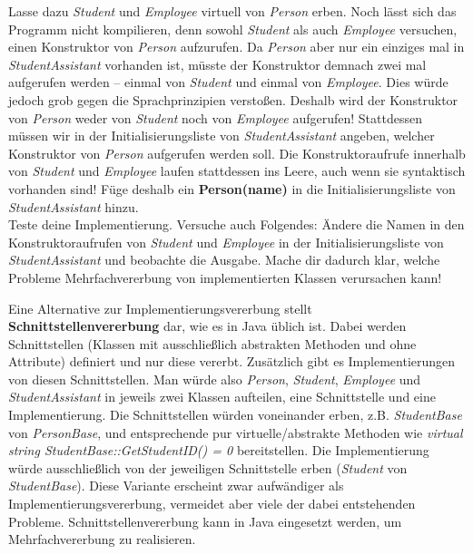 \begin{enumerate}
Lasse dazu \emph{Student} und \emph{Employee} virtuell von \emph{Person} erben.
Noch lässt sich das Programm nicht kompilieren, denn sowohl \emph{Student} als auch \emph{Employee} versuchen, einen Konstruktor von \emph{Person} aufzurufen.
Da \emph{Person} aber nur ein einziges mal in \emph{StudentAssistant} vorhanden ist, müsste der Konstruktor demnach zwei mal aufgerufen werden -- einmal von \emph{Student} und einmal von \emph{Employee}.
Dies würde jedoch grob gegen die Sprachprinzipien verstoßen.
Deshalb wird der Konstruktor von \emph{Person} weder von \emph{Student} noch von \emph{Employee} aufgerufen!
Stattdessen müssen wir in der Initialisierungsliste von \emph{StudentAssistant} angeben, welcher Konstruktor von \emph{Person} aufgerufen werden soll.
Die Konstruktoraufrufe innerhalb von \emph{Student} und \emph{Employee} laufen stattdessen ins Leere, auch wenn sie syntaktisch vorhanden sind! Füge deshalb ein \textbf{Person(name)} in die Initialisierungsliste von \emph{StudentAssistant} hinzu.\\

Teste deine Implementierung.
Versuche auch Folgendes: Ändere die Namen in den Konstruktoraufrufen von \emph{Student} und \emph{Employee} in der Initialisierungsliste von \emph{StudentAssistant} und beobachte die Ausgabe. 
Mache dir dadurch klar, welche Probleme Mehrfachvererbung von implementierten Klassen verursachen kann!\\

\end{enumerate}

Eine Alternative zur Implementierungsvererbung stellt \textbf{Schnittstellenvererbung} dar, wie es in Java üblich ist. Dabei werden Schnittstellen (Klassen mit ausschließlich abstrakten Methoden und ohne Attribute) definiert und nur diese vererbt.
Zusätzlich gibt es Implementierungen von diesen Schnittstellen.
Man würde also \emph{Person}, \emph{Student}, \emph{Employee} und \emph{StudentAssistant} in jeweils zwei Klassen aufteilen, eine Schnittstelle und eine Implementierung.
Die Schnittstellen würden voneinander erben, z.B. \emph{StudentBase} von \emph{PersonBase}, und entsprechende pur virtuelle/abstrakte Methoden wie \emph{virtual string StudentBase::GetStudentID() = 0} bereitstellen.
Die Implementierung würde ausschließlich von der jeweiligen Schnittstelle erben (\emph{Student} von \emph{StudentBase}).
Diese Variante erscheint zwar aufwändiger als Implementierungsvererbung, vermeidet aber viele der dabei entstehenden Probleme. 
Schnittstellenvererbung kann in Java eingesetzt werden, um Mehrfachvererbung zu realisieren.


